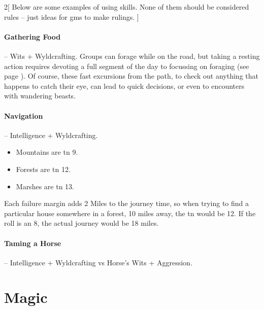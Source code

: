 \begin{multicols}{2}[
  Below are some examples of using skills.
  None of them should be considered rules -- just ideas for \glspl{gm} to make rulings.
]
\paragraph{Gathering Food} -- Wits + Wyldcrafting.
Groups can forage while on the road, but taking a resting action requires devoting a full segment of the day to focussing on foraging (see page \pageref{daytimes}).
Of course, these fast excursions from the path, to check out anything that happens to catch their eye, can lead to quick decisions, or even to encounters with wandering beasts.

\paragraph{Navigation} -- Intelligence + Wyldcrafting.
\label{marching}
\begin{itemize}

  \item
    Mountains are \gls{tn} 9.
  \item
    Forests are \gls{tn} 12.
  \item
    Marshes are \gls{tn} 13.

\end{itemize}

Each failure margin adds 2 Miles to the journey time, so when trying to find a particular house somewhere in a forest, 10 miles away, the \gls{tn} would be 12.
If the roll is an 8, the actual journey would be 18 miles.

\paragraph{Taming a Horse} -- Intelligence + Wyldcrafting vs Horse's Wits + Aggression.

\end{multicols}

\section{Magic}

